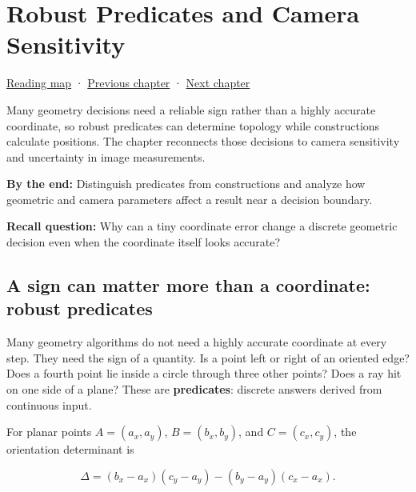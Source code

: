\chapter{Robust Predicates and Camera Sensitivity}\label{02-foundations-ii-ch034-robust-predicates-and-camera-sensitivity}\hypertarget{02-foundations-ii-ch034}{}\label{stagechapter:02-foundations-ii-ch034}

\hypertarget{02-foundations-ii-ch034-robust-predicates-and-camera-sensitivity}{}

\hyperref[volume-reading-map]{Reading map} · \hyperref[02-foundations-ii-ch033-projection-clipping-and-raster-sampling]{Previous chapter} · \hyperref[02-foundations-ii-ch035-camera-extrinsics-and-projection-geometry]{Next chapter}

Many geometry decisions need a reliable sign rather than a highly accurate coordinate, so robust predicates can determine topology while constructions calculate positions. The chapter reconnects those decisions to camera sensitivity and uncertainty in image measurements.

\textbf{By the end:} Distinguish predicates from constructions and analyze how geometric and camera parameters affect a result near a decision boundary.

\textbf{Recall question:} Why can a tiny coordinate error change a discrete geometric decision even when the coordinate itself looks accurate?

\section{A sign can matter more than a coordinate: robust predicates}\label{02-foundations-ii-ch034-a-sign-can-matter-more-than-a-coordinate-robust-predicates}

\hypertarget{02-foundations-ii-ch034-a-sign-can-matter-more-than-a-coordinate-robust-predicates}{}

Many geometry algorithms do not need a highly accurate coordinate at every step. They need the sign of a quantity. Is a point left or right of an oriented edge? Does a fourth point lie inside a circle through three other points? Does a ray hit on one side of a plane? These are \textbf{predicates}: discrete answers derived from continuous input.

For planar points \(A=(a_x,a_y)\), \(B=(b_x,b_y)\), and \(C=(c_x,c_y)\), the orientation determinant is

\[
\Delta = (b_x-a_x)(c_y-a_y)-(b_y-a_y)(c_x-a_x).
\]

